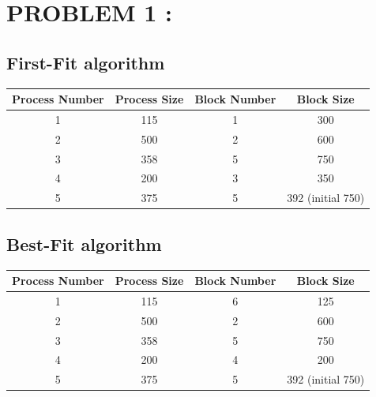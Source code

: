 \documentclass[a4paper]{article}
\begin{document}

\newpage
\tableofcontents
\newpage

\section{PROBLEM 1 :}

\subsection{First-Fit algorithm}
\begin{center}
\begin{tabular}{|c|c|c|c|}
\hline
Process Number & Process Size & Block Number & Block Size\\
\hline
1 & 115	& 1 & 300\\
\hline
2 & 500	& 2 & 600\\
\hline
3 & 358	& 5 & 750\\
\hline
4 & 200 & 3 & 350\\
\hline
5 & 375 & 5 & 392 (initial 750)\\
\hline
\end{tabular}
\end{center}

\subsection{Best-Fit algorithm}
\begin{center}
\begin{tabular}{|c|c|c|c|}
\hline
Process Number & Process Size & Block Number & Block Size\\
\hline
1 & 115	& 6 & 125\\
\hline
2 & 500 & 2 & 600\\
\hline
3 & 358	& 5 & 750\\
\hline
4 & 200	& 4 & 200\\
\hline
5 & 375	& 5 & 392 (initial 750)\\
\hline
\end{tabular}
\end{center}
\end{document}
